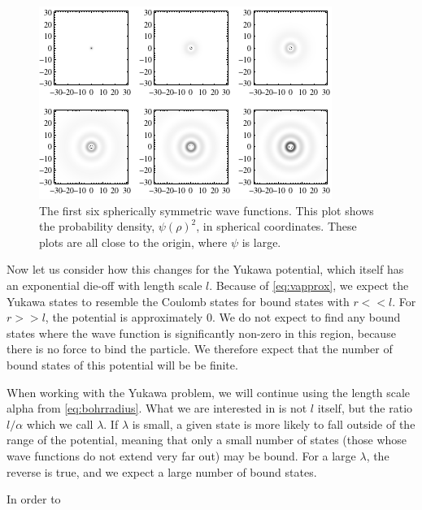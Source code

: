 \documentclass[12pt,twoside]{reedthesis}
\begin{document}
\begin{figure}[h]
\centering
\includegraphics{Figures/densityplots}
\caption[Density plots of the first six spherically symmetric Coulomb wave functions]{The first six spherically symmetric wave functions. This plot shows the probability density, $\psi(\rho)^2$, in spherical coordinates. These plots are all close to the origin, where $\psi$ is large.}
\label{fig:boundstates}
\end{figure}

Now let us consider how this changes for the Yukawa potential, which itself has an exponential die-off with length scale $l$. Because of \eqref{eq:vapprox}, we expect the Yukawa states to resemble the Coulomb states for bound states with $r << l$. For $r >> l$, the potential is approximately $0$. We do not expect to find any bound states where the wave function is significantly non-zero in this region, because there is no force to bind the particle. We therefore expect that the number of bound states of this potential will be be finite.

When working with the Yukawa problem, we will continue using the length scale alpha from \eqref{eq:bohrradius}. What we are interested in is not $l$ itself, but the ratio $l / \alpha$ which we call $\lambda$.
If $\lambda$ is small, a given state is more likely to fall outside of the range of the potential, meaning that only a small number of states (those whose wave functions do not extend very far out) may be bound. For a large $\lambda$, the reverse is true, and we expect a large number of bound states.

In order to 

\clearpage %
\end{document}
